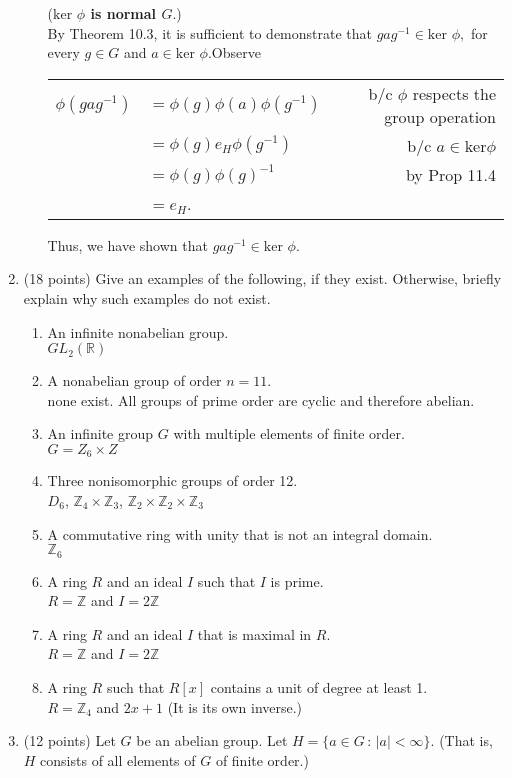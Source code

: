 \documentclass[12pt]{article}
\newcommand{\bbZ}{\mathbb{Z}}
\newcommand{\bbR}{\mathbb{R}}
\begin{document}
\begin{enumerate}
\begin{enumerate}
	(\textbf{$\text{ker }\phi$ is normal $G.$})\\
	 By Theorem 10.3, it is sufficient to demonstrate that $gag^{-1} \in \text{ker }\phi,$ for every $g \in G$ and $a \in \text{ker }\phi.$Observe \\
	\begin{tabular}{rlr}
	$\phi(gag^{-1})$&$=\phi(g)\phi(a)\phi(g^{-1})$& b/c $\phi$ respects the group operation\\
	&$=\phi(g)e_H\phi(g^{-1})$& b/c $a \in \text{ker}\phi$ \\
	&$=\phi(g)\phi(g)^{-1}$&by Prop 11.4\\
	&$=e_H$.&\\
	\end{tabular}
	
	Thus, we have shown that $gag^{-1} \in \text{ker }\phi.$\\

	\end{enumerate}
\item ({\small18 points}) Give an examples of the following, if they exist. Otherwise, briefly explain why such examples do not exist.
	\begin{enumerate}
	\item An infinite nonabelian group.\\
	
	$GL_2(\bbR)$\\
	\vfill
	\item A nonabelian group of order $n=11.$\\
	none exist. All groups of prime order are cyclic and therefore abelian.\\
	\vfill
	\item An infinite group $G$ with multiple elements of finite order.\\ 
	
	$G=Z_6 \times Z$\\ 
	\vfill
	\item Three nonisomorphic groups of order 12.\\
	
	$D_6$, $\bbZ_4 \times \bbZ_3$, $\bbZ_2 \times \bbZ_2 \times \bbZ_3$
	\vfill
	\item A commutative ring with unity that is not an integral domain.\\
	
	$\bbZ_6$
	\vfill
	\item A ring $R$ and an ideal $I$ such that $I$ is prime.\\
	$R=\bbZ$ and $I=2\bbZ$
	\vfill
	\item A ring $R$ and an ideal $I$ that is maximal in $R$.\\
	$R=\bbZ$ and $I=2\bbZ$
	\vfill
	\item A ring $R$ such that $R[x]$ contains a unit of degree at least 1.\\
	$R=\bbZ_4$ and $2x+1$ (It is its own inverse.)
	\vfill
	\end{enumerate}
\item ({\small 12 points}) Let $G$ be an abelian group. Let $H=\{ a \in G\, : \, |a| < \infty\}.$ (That is, $H$ consists of all elements of $G$ of finite order.)\\


\end{enumerate}
\end{document}
